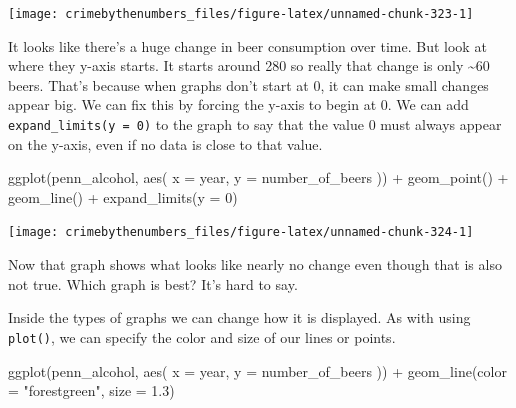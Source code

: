 \documentclass[
]{krantz}
\makeatletter
\newenvironment{Shaded}{\begin{snugshade}}{\end{snugshade}}
\newcommand{\AttributeTok}[1]{\textcolor[rgb]{0.61,0.61,0.61}{#1}}
\newcommand{\DecValTok}[1]{\textcolor[rgb]{0.06,0.06,0.06}{#1}}
\newcommand{\FloatTok}[1]{\textcolor[rgb]{0.06,0.06,0.06}{#1}}
\newcommand{\FunctionTok}[1]{\textcolor[rgb]{0,0,0}{#1}}
\newcommand{\NormalTok}[1]{#1}
\newcommand{\SpecialCharTok}[1]{\textcolor[rgb]{0,0,0}{#1}}
\newcommand{\StringTok}[1]{\textcolor[rgb]{0.5,0.5,0.5}{#1}}
\newenvironment{kframe}{%
\medskip{}
\setlength{\fboxsep}{.8em}
 \def\at@end@of@kframe{}%
 \ifinner\ifhmode%
  \def\at@end@of@kframe{\end{minipage}}%
  \begin{minipage}{\columnwidth}%
 \fi\fi%
 \def\FrameCommand##1{\hskip\@totalleftmargin \hskip-\fboxsep
 \colorbox{shadecolor}{##1}\hskip-\fboxsep
     \hskip-\linewidth \hskip-\@totalleftmargin \hskip\columnwidth}%
 \MakeFramed {\advance\hsize-\width
   \@totalleftmargin\z@ \linewidth\hsize
   \@setminipage}}%
 {\par\unskip\endMakeFramed%
 \at@end@of@kframe}
\renewenvironment{Shaded}{\begin{kframe}}{\end{kframe}}
\makeatother
\begin{document}
\begin{center}\texttt{[image: crimebythenumbers\_files/figure-latex/unnamed-chunk-323-1]} \end{center}

It looks like there's a huge change in beer consumption over
time. But look at where they y-axis starts. It starts around
280 so really that change is only \textasciitilde60 beers.
That's because when graphs don't start at 0, it can make
small changes appear big. We can fix this by forcing the
y-axis to begin at 0. We can add
\texttt{expand\_limits(y\ =\ 0)} to the graph to say that
the value 0 must always appear on the y-axis, even if no
data is close to that value.

\begin{Shaded}
\begin{Highlighting}[]
\FunctionTok{ggplot}\NormalTok{(penn\_alcohol, }\FunctionTok{aes}\NormalTok{(}
  \AttributeTok{x =}\NormalTok{ year,}
  \AttributeTok{y =}\NormalTok{ number\_of\_beers}
\NormalTok{)) }\SpecialCharTok{+}
  \FunctionTok{geom\_point}\NormalTok{() }\SpecialCharTok{+}
  \FunctionTok{geom\_line}\NormalTok{() }\SpecialCharTok{+}
  \FunctionTok{expand\_limits}\NormalTok{(}\AttributeTok{y =} \DecValTok{0}\NormalTok{)}
\end{Highlighting}
\end{Shaded}

\begin{center}\texttt{[image: crimebythenumbers\_files/figure-latex/unnamed-chunk-324-1]} \end{center}

Now that graph shows what looks like nearly no change even
though that is also not true. Which graph is best? It's hard
to say.

Inside the types of graphs we can change how it is
displayed. As with using \texttt{plot()}, we can specify the
color and size of our lines or points.

\begin{Shaded}
\begin{Highlighting}[]
\FunctionTok{ggplot}\NormalTok{(penn\_alcohol, }\FunctionTok{aes}\NormalTok{(}
  \AttributeTok{x =}\NormalTok{ year,}
  \AttributeTok{y =}\NormalTok{ number\_of\_beers}
\NormalTok{)) }\SpecialCharTok{+}
  \FunctionTok{geom\_line}\NormalTok{(}\AttributeTok{color =} \StringTok{"forestgreen"}\NormalTok{, }\AttributeTok{size =} \FloatTok{1.3}\NormalTok{)}
\end{Highlighting}
\end{Shaded}
\end{document}
